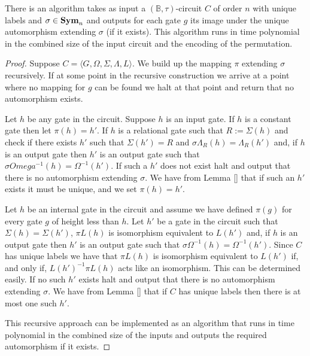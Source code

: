\documentclass[../paper.tex]{subfiles}
\begin{document}
\begin{lem}
  There is an algorithm takes as input a $(\mathbb{B}, \tau)$-circuit $C$ of
  order $n$ with unique labels and $\sigma \in \text{\textbf{Sym}}_n$ and outputs for each gate
  $g$ its image under the unique automorphism extending $\sigma$ (if it exists).
  This algorithm runs in time polynomial in the combined size of the input
  circuit and the encoding of the permutation.
  \label{lem:compute-automorphisms}
\end{lem}
\begin{proof}
  Suppose $C = \langle G, \Omega, \Sigma, \Lambda, L \rangle$. We build up the
  mapping $\pi$ extending $\sigma$ recursively. If at some point in the
  recursive construction we arrive at a point where no mapping for $g$ can be
  found we halt at that point and return that no automorphism exists.

  Let $h$ be any gate in the circuit. Suppose $h$ is an input gate. If $h$ is a
  constant gate then let $\pi (h) = h'$. If $h$ is a relational gate such that
  $R := \Sigma(h)$ and check if there exists $h'$ such that $\Sigma (h') = R$
  and $\sigma \Lambda_R(h) = \Lambda_R(h')$ and, if $h$ is an output gate then
  $h'$ is an output gate such that $\sigma Omega^{-1}(h) = \Omega^{-1}(h')$. If
  such a $h'$ does not exist halt and output that there is no automorphism
  extending $\sigma$. We have from Lemma \ref{} that if such an $h'$ exists it
  must be unique, and we set $\pi(h) = h'$.

  Let $h$ be an internal gate in the circuit and assume we have defined $\pi
  (g)$ for every gate $g$ of height less than $h$. Let $h'$ be a gate in the
  circuit such that $\Sigma(h) = \Sigma (h')$, $\pi L(h)$ is isomorphism
  equivalent to $L(h')$ and, if $h$ is an output gate then $h'$ is an output
  gate such that $\sigma \Omega^{-1}(h) = \Omega^{-1}(h')$. Since $C$ has unique
  labels we have that $\pi L(h)$ is isomorphism equivalent to $L(h')$ if, and
  only if, $L(h')^{-1}\pi L(h)$ acts like an isomorphism. This can be determined
  easily. If no such $h'$ exists halt and output that there is no automorphism
  extending $\sigma$. We have from Lemma \ref{} that if $C$ has unique labels
  then there is at most one such $h'$.

  This recursive approach can be implemented as an algorithm that runs in time
  polynomial in the combined size of the inputs and outputs the required
  automorphism if it exists.
\end{proof}
\end{document}

